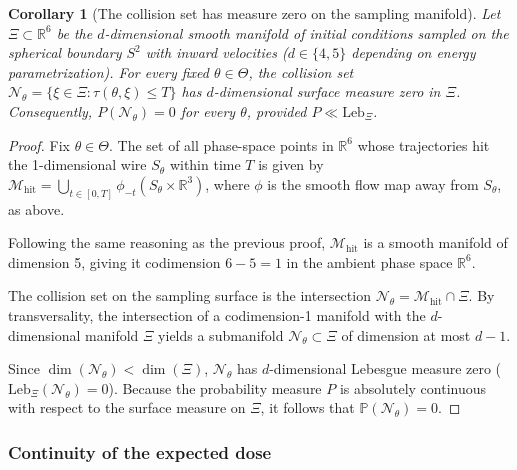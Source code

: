 \documentclass{article}
\newtheorem{corollary}{Corollary}
\begin{document}
	\begin{corollary}[The collision set has measure zero on the sampling manifold] \label{cor:collision_null2}
		Let $\Xi \subset \mathbb{R}^6$ be the $d$-dimensional smooth manifold of initial conditions sampled on the spherical boundary $S^2$ with inward velocities ($d \in \{4, 5\}$ depending on energy parametrization). For every fixed $\theta \in \Theta$, the collision set $\mathcal{N}_\theta = \{\xi \in \Xi : \tau(\theta,\xi) \le T\}$ has $d$-dimensional surface measure zero in $\Xi$. Consequently, $P(\mathcal{N}_\theta) = 0$ for every $\theta$, provided $P \ll \mathrm{Leb}_\Xi$.
	\end{corollary}
	\begin{proof}
		Fix $\theta \in \Theta$. The set of all phase-space points in $\mathbb{R}^6$ whose trajectories hit the 1-dimensional wire $S_\theta$ within time $T$ is given by $\mathcal{M}_{\text{hit}} = \bigcup_{t \in [0,T]} \phi_{-t}(S_\theta \times \mathbb{R}^3)$, where $\phi$ is the smooth flow map away from $S_\theta$, as above. 
		
		Following the same reasoning as the previous proof, $\mathcal{M}_{\text{hit}}$ is a smooth manifold of dimension 5, giving it codimension $6 - 5 = 1$ in the ambient phase space $\mathbb{R}^6$.
		
		The collision set on the sampling surface is the intersection $\mathcal{N}_\theta = \mathcal{M}_{\text{hit}} \cap \Xi$. By transversality, the intersection of a codimension-1 manifold with the $d$-dimensional manifold $\Xi$ yields a submanifold $\mathcal{N}_\theta \subset \Xi$ of dimension at most $d - 1$. 
		
		Since $\dim(\mathcal{N}_\theta) < \dim(\Xi)$, $\mathcal{N}_\theta$ has $d$-dimensional Lebesgue measure zero ($\mathrm{Leb}_\Xi(\mathcal{N}_\theta) = 0$). Because the probability measure $P$ is absolutely continuous with respect to the surface measure on $\Xi$, it follows that $\mathbb{P}(\mathcal{N}_\theta) = 0$.
	\end{proof}
	
	\subsubsection{Continuity of the expected dose}
	
\end{document}
